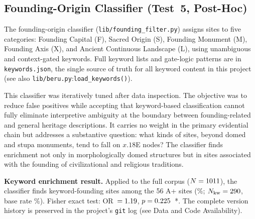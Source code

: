 \documentclass[HARVARD,twocolumn]{USG}
\begin{document}
\subsection{Founding-Origin Classifier (Test~5, Post-Hoc)}
\label{sec:kwdaudit_founding}

The founding-origin classifier (\texttt{lib/founding\_filter.py})
assigns sites to five categories: Founding Capital (F), Sacred Origin
(S), Founding Monument (M), Founding Axis (X), and Ancient Continuous
Landscape (L), using unambiguous and context-gated keywords. Full
keyword lists and gate-logic patterns are in \texttt{keywords.json},
the single source of truth for all keyword content in this project
(see also \texttt{lib/beru.py}:\texttt{load\_keywords()}).

This classifier was iteratively tuned after data inspection. The
objective was to reduce false positives while accepting that keyword-based
classification cannot fully eliminate interpretive ambiguity at
the boundary between founding-related and general heritage
descriptions. It carries no weight in the primary evidential
chain but addresses a substantive question: what kinds of sites,
beyond domed and stupa monuments, tend to fall on $x.18$\textdegree{}E
nodes? The classifier finds enrichment not only in morphologically
domed structures but in sites associated with the founding of
civilizational and religious traditions.

\textbf{Keyword enrichment result.}
Applied to the full corpus ($N = 1011$), the classifier finds
\NfoundKwAp{} keyword-founding sites among the 56 A+ sites
(\foundKwApRate\%; $N_{\mathrm{kw}} = 290$, base rate
\foundKwBaseRate\%). Fisher exact test: OR~$= 1.19$,
$p = 0.225$~*. The complete version history is preserved in
the project's \texttt{git} log (see Data and Code Availability).



\end{document}
